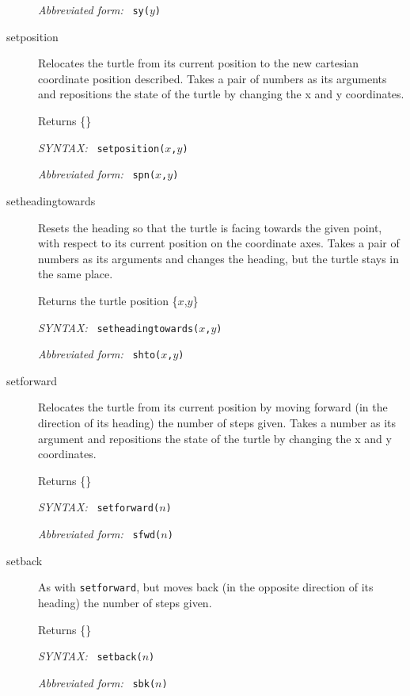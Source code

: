 \documentclass[11pt]{article}
\newcommand{\syntax}{\textsl{SYNTAX: }}
\newcommand{\abb}{\textsl{Abbreviated form: }}
\begin{document}
\begin{description}
       \abb\ {\tt sy($y$)}
 \item[setposition] Relocates the turtle from its current position to the 
       new cartesian coordinate position described. Takes a pair of
       numbers as its arguments and repositions the state of the turtle by 
       changing the x and y coordinates.

       Returns \{\}

       \syntax\ {\tt setposition($x$,$y$)}

       \abb\ {\tt spn($x$,$y$)}
 \item[setheadingtowards] Resets the heading so that the turtle is facing
       towards the given point, with respect to its current position on
       the coordinate axes. Takes a pair of numbers as its arguments and
       changes the heading, but the turtle stays in the same place.

       Returns the turtle position \{$x$,$y$\}

       \syntax\ {\tt setheadingtowards($x$,$y$)}

       \abb\ {\tt shto($x$,$y$)}
 \item[setforward] Relocates the turtle from its current position by
       moving forward (in the direction of its heading) the number of
       steps given. Takes a number as its argument and repositions the
       state of the turtle by changing the x and y coordinates.

       Returns \{\}

       \syntax\ {\tt setforward($n$)}

       \abb\ {\tt sfwd($n$)}
 \item[setback] As with {\tt setforward}, but moves back (in the opposite
       direction of its heading) the number of steps given.

       Returns \{\}

       \syntax\ {\tt setback($n$)}

       \abb\ {\tt sbk($n$)}
\end{description}
\end{document}
